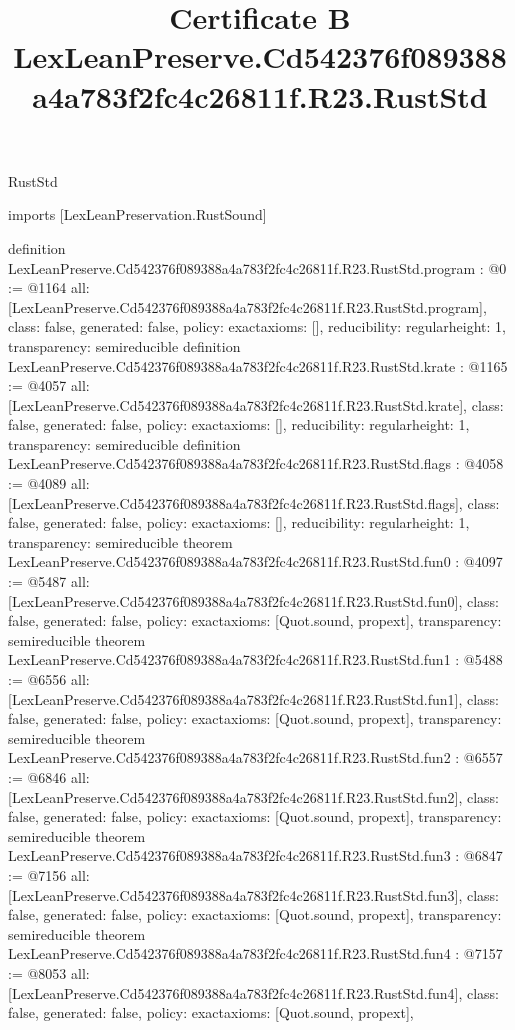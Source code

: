 \begin{lexlean}{RustStd}
\title{Certificate B LexLeanPreserve.Cd542376f089388a4a783f2fc4c26811f.R23.RustStd}
\begin{coremodule}
imports [LexLeanPreservation.RustSound]

definition LexLeanPreserve.Cd542376f089388a4a783f2fc4c26811f.R23.RustStd.program : @0 := @1164 {
  all: [LexLeanPreserve.Cd542376f089388a4a783f2fc4c26811f.R23.RustStd.program],
  class: false,
  generated: false,
  policy: exact{axioms: []},
  reducibility: regular{height: 1},
  transparency: semireducible
}
definition LexLeanPreserve.Cd542376f089388a4a783f2fc4c26811f.R23.RustStd.krate : @1165 := @4057 {
  all: [LexLeanPreserve.Cd542376f089388a4a783f2fc4c26811f.R23.RustStd.krate],
  class: false,
  generated: false,
  policy: exact{axioms: []},
  reducibility: regular{height: 1},
  transparency: semireducible
}
definition LexLeanPreserve.Cd542376f089388a4a783f2fc4c26811f.R23.RustStd.flags : @4058 := @4089 {
  all: [LexLeanPreserve.Cd542376f089388a4a783f2fc4c26811f.R23.RustStd.flags],
  class: false,
  generated: false,
  policy: exact{axioms: []},
  reducibility: regular{height: 1},
  transparency: semireducible
}
theorem LexLeanPreserve.Cd542376f089388a4a783f2fc4c26811f.R23.RustStd.fun0 : @4097 := @5487 {
  all: [LexLeanPreserve.Cd542376f089388a4a783f2fc4c26811f.R23.RustStd.fun0],
  class: false,
  generated: false,
  policy: exact{axioms: [Quot.sound, propext]},
  transparency: semireducible
}
theorem LexLeanPreserve.Cd542376f089388a4a783f2fc4c26811f.R23.RustStd.fun1 : @5488 := @6556 {
  all: [LexLeanPreserve.Cd542376f089388a4a783f2fc4c26811f.R23.RustStd.fun1],
  class: false,
  generated: false,
  policy: exact{axioms: [Quot.sound, propext]},
  transparency: semireducible
}
theorem LexLeanPreserve.Cd542376f089388a4a783f2fc4c26811f.R23.RustStd.fun2 : @6557 := @6846 {
  all: [LexLeanPreserve.Cd542376f089388a4a783f2fc4c26811f.R23.RustStd.fun2],
  class: false,
  generated: false,
  policy: exact{axioms: [Quot.sound, propext]},
  transparency: semireducible
}
theorem LexLeanPreserve.Cd542376f089388a4a783f2fc4c26811f.R23.RustStd.fun3 : @6847 := @7156 {
  all: [LexLeanPreserve.Cd542376f089388a4a783f2fc4c26811f.R23.RustStd.fun3],
  class: false,
  generated: false,
  policy: exact{axioms: [Quot.sound, propext]},
  transparency: semireducible
}
theorem LexLeanPreserve.Cd542376f089388a4a783f2fc4c26811f.R23.RustStd.fun4 : @7157 := @8053 {
  all: [LexLeanPreserve.Cd542376f089388a4a783f2fc4c26811f.R23.RustStd.fun4],
  class: false,
  generated: false,
  policy: exact{axioms: [Quot.sound, propext]},
}
\end{coremodule}
\end{lexlean}
